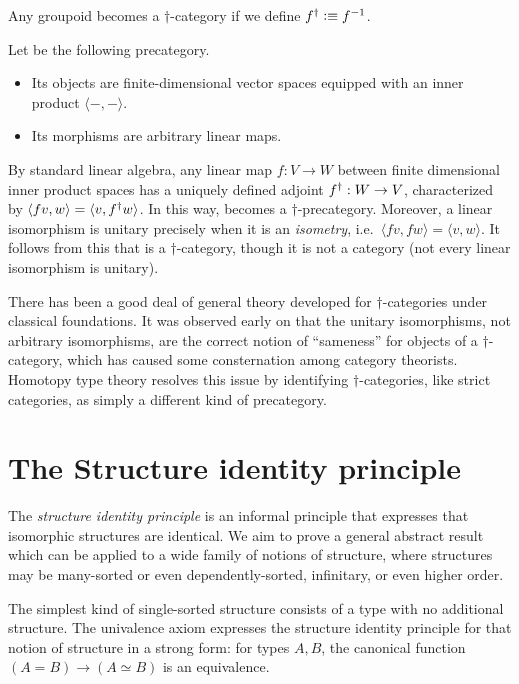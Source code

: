 \begin{eg}
  Any groupoid becomes a $\dagger$-category if we define ${f}^{\dagger} \vcentcolon\equiv {f}^{-1}$.
\end{eg}

\begin{eg}\label{ct:hilb}
  Let \uhilb be the following precategory.
  \begin{itemize}
  \item Its objects are finite-dimensional vector spaces equipped with an inner product $\langle -,-\rangle$.
  \item Its morphisms are arbitrary linear maps.
  \end{itemize}
  By standard linear algebra, any linear map $f:V\to W$ between finite
  dimensional inner product spaces has a uniquely defined adjoint ${f}^{\dagger}:W\to V$, characterized by $\langle f v,w\rangle = \langle v,{f}^{\dagger} w\rangle$.
  In this way, \uhilb becomes a $\dagger$-precategory.
  Moreover, a linear isomorphism is unitary precisely when it is an \emph{isometry}, i.e.\ $\langle fv,fw\rangle = \langle v,w\rangle$.
  It follows from this that \uhilb is a $\dagger$-category, though it is not a category (not every linear isomorphism is unitary).
\end{eg}

There has been a good deal of general theory developed for $\dagger$-categories under classical foundations.
It was observed early on that the unitary isomorphisms, not arbitrary isomorphisms, are the correct notion of ``sameness'' for objects of a $\dagger$-category, which has caused some consternation among category theorists.
Homotopy type theory resolves this issue by identifying $\dagger$-categories, like strict categories, as simply a different kind of precategory.


\section{The Structure identity principle}
\label{sec:sip}

The \emph{structure identity principle} is an informal principle
that expresses that isomorphic structures are identical.  We aim to
prove a general abstract result which can be applied to a wide family
of notions of structure, where structures may be many-sorted or even
dependently-sorted, infinitary, or even higher order.

The simplest kind of single-sorted structure consists of a type with
no additional structure.  The univalence axiom expresses the structure identity principle for that
notion of structure in a strong form: for types $A,B$, the
canonical function $(A=B)\to (A\simeq B)$ is an equivalence.

